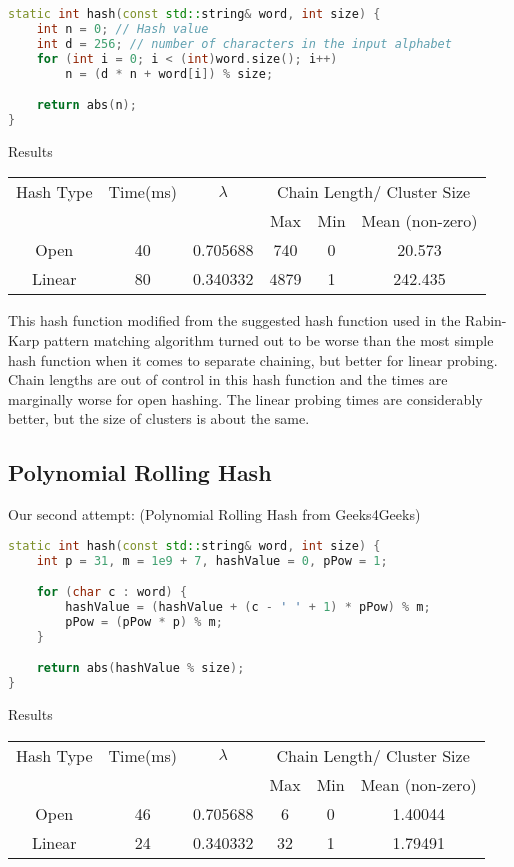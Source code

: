 \documentclass[12pt]{article}
\begin{document}
\begin{lstlisting}[language=C++]
static int hash(const std::string& word, int size) {
    int n = 0; // Hash value
    int d = 256; // number of characters in the input alphabet 
    for (int i = 0; i < (int)word.size(); i++)
        n = (d * n + word[i]) % size;

    return abs(n);
}
\end{lstlisting}

\begin{center}
Results\\
\begin{tabular}{|c|c|c|c|c|c|}
\hline
Hash Type & Time(ms) & $\lambda$ & \multicolumn{3}{|c|}{Chain Length/ Cluster Size} \\
 & & & Max & Min & Mean (non-zero) \\
\hline
Open & 40 & 0.705688 & 740 & 0 & 20.573\\
Linear & 80 & 0.340332 & 4879 & 1 & 242.435\\
\hline
\end{tabular}
\end{center}

This hash function modified from the suggested hash function used in the Rabin-Karp pattern matching algorithm turned out to be worse than the most simple hash function when it comes to separate chaining, but better for linear probing. Chain lengths are out of control in this hash function and the times are marginally worse for open hashing. The linear probing times are considerably better, but the size of clusters is about the same.

\subsection{Polynomial Rolling Hash}

Our second attempt: (Polynomial Rolling Hash from Geeks4Geeks)
\begin{lstlisting}[language=C++]
static int hash(const std::string& word, int size) {
    int p = 31, m = 1e9 + 7, hashValue = 0, pPow = 1;

    for (char c : word) {
        hashValue = (hashValue + (c - ' ' + 1) * pPow) % m;
        pPow = (pPow * p) % m;
    }

    return abs(hashValue % size);
}
\end{lstlisting}

\begin{center}
Results\\
\begin{tabular}{|c|c|c|c|c|c|}
\hline
Hash Type & Time(ms) & $\lambda$ & \multicolumn{3}{|c|}{Chain Length/ Cluster Size} \\
 & & & Max & Min & Mean (non-zero) \\
\hline
Open & 46 & 0.705688 & 6 & 0 & 1.40044\\
Linear & 24 & 0.340332 & 32 & 1 & 1.79491\\
\hline
\end{tabular}
\end{center}
\end{document}
